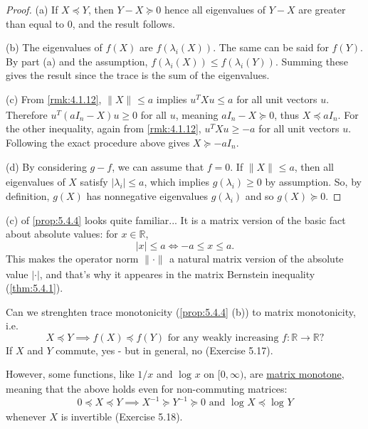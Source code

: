 \begin{proof}
(a) If $X \preceq Y$, then $Y - X \succeq 0$ hence all eigenvalues of $Y - X$ are greater than equal to 0, 
and the result follows.

(b) The eigenvalues of $f(X)$ are $f(\lambda_i(X))$. The same can be said for $f(Y)$. By part (a) and the 
assumption, $f(\lambda_i(X)) \leq f(\lambda_i(Y))$. Summing these gives the result since the trace is the sum 
of the eigenvalues.

(c) From \cref{rmk:4.1.12}, $\lVert X \rVert_{} \leq a$ implies $u^T Xu \leq a$ for all unit vectors $u$. 
Therefore $u^T(aI_n - X)u \geq 0$ for all $u$, meaning $aI_n - X \succeq 0$, thus $X \preceq aI_n$. For the 
other inequality, again from \cref{rmk:4.1.12}, $u^T Xu \geq -a$ for all unit vectors $u$. Following the 
exact procedure above gives $X \succeq -aI_n$.

(d) By considering $g - f$, we can assume that $f = 0$. If $\lVert X \rVert_{} \leq a$, then all eigenvalues 
of $X$ satisfy $|\lambda_i| \leq a$, which implies $g(\lambda_i) \geq 0$ by assumption. So, by definition, 
$g(X)$ has nonnegative eigenvalues $g(\lambda_i)$ and so $g(X) \succeq 0$.
\end{proof}

\begin{remark}
\label{rmk:5.4.5}
(c) of \cref{prop:5.4.4} looks quite familiar... It is a matrix version of the basic fact about absolute 
values: for $x \in \mathbb{R}$, 
\[ |x| \leq a \iff -a \leq x \leq a. \]
This makes the operator norm $\lVert \cdot \rVert_{}$ a natural matrix version of the absolute value $|\cdot|$, 
and that's why it appeares in the matrix Bernstein inequality (\cref{thm:5.4.1}).
\end{remark}

\begin{remark}
\label{rmk:5.4.6}
Can we strenghten trace monotonicity (\cref{prop:5.4.4} (b)) to matrix monotonicity, i.e.
\[ X \preceq Y \implies f(X) \preceq f(Y) \text{ for any weakly increasing } f: \mathbb{R} \to \mathbb{R}? \]
If $X$ and $Y$ commute, yes - but in general, no (Exercise 5.17). 

However, some functions, like $1/x$ and $\log_{}{x}$ on $[0, \infty)$, are \underline{matrix monotone}, meaning 
that the above holds even for non-commuting matrices:
\[ 0 \preceq X \preceq Y \implies X^{-1} \succeq Y^{-1} \succeq 0 \text{ and } \log_{}{X} \preceq \log_{}{Y} \]
whenever $X$ is invertible (Exercise 5.18).
\end{remark}


